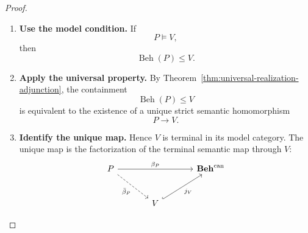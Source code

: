 \begin{proof}
    \leavevmode
    \begin{enumerate}
        \item \textbf{Use the model condition.}
        If
        \[
            P\models V,
        \]
        then
        \[
            \operatorname{Beh}(P)\leq V.
        \]

        \item \textbf{Apply the universal property.}
        By Theorem~\ref{thm:universal-realization-adjunction}, the containment
        \[
            \operatorname{Beh}(P)\leq V
        \]
        is equivalent to the existence of a unique strict semantic homomorphism
        \[
            P\to V.
        \]

        \item \textbf{Identify the unique map.}
        Hence \(V\) is terminal in its model category. The unique map is the
        factorization of the terminal semantic map through \(V\):
        \[
        \begin{tikzcd}[column sep=large, row sep=large]
            P
                \arrow[rr, "\beta_P"]
                \arrow[dr, dashed, "\bar\beta_P"']
            &&
            \mathbf{Beh}^{\mathrm{can}}
            \\
            &
            V
                \arrow[ur, hook, "j_V"']
            &
        \end{tikzcd}
        \]
    \end{enumerate}
\end{proof}

